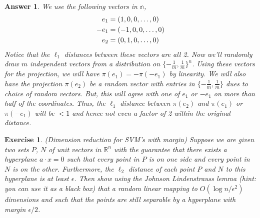 \documentclass[12pt]{article}
\theoremstyle{colon}
\newtheorem{exercise}{Exercise}
\newtheorem*{answer}{Answer}
\begin{document}
\begin{answer}
  We use the following vectors in $\mathbb{n}$,
  \begin{gather*}
    e_1 = (1,0,0,\mathellipsis,0) \\
    -e_1 = (-1,0,0,\mathellipsis,0) \\
    e_2 = (0,1,0,\mathellipsis,0)
  \end{gather*}
  Notice that the $\ell_1$ distances between these vectors are all 2. Now we'll randomly draw $m$ independent vectors from a distribution on $\{ -\frac{1}{m}, \frac{1}{m} \}^n$. Using these vectors for the projection, we will have $\pi(e_1) = -\pi(-e_1)$ by linearity. We will also have the projection $\pi(e_2)$  be a random vector with entries in $\{ -\frac{1}{m}, \frac{1}{m} \}$ dues to choice of random vectors. But, this will agree with one of $e_1$ or $-e_1$ on more than half of the coordinates. Thus, the $\ell_1$ distance between $\pi(e_2)$ and $\pi(e_1)$ or $\pi(-e_1)$ will be $< 1$ and hence not even a factor of 2 within the original distance.
\end{answer}

\clearpage

\begin{exercise}
  (Dimension reduction for SVM's with margin) Suppose we are given two sets $P$, $N$ of unit vectors in $\mathbb{R}^n$ with the guarantee that there exists a hyperplane $a \cdot x = 0$ such that every point in $P$ is on one side and every point in $N$ is on the other. Furthermore, the $\ell_2$ distance of each point $P$ and $N$ to this hyperplane is at least $\epsilon$. Then show using the Johnson Lindenstrauss lemma (hint: you can use it as a black box) that a random linear mapping to $O(\log n/\epsilon^2)$ dimensions and such that the points are still separable by a hyperplane with margin $\epsilon/2$.
\end{exercise}
\end{document}
